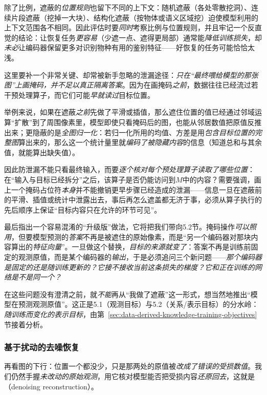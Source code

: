 除了比例，遮蔽的\emph{位置规则}也留下不同的上下文：随机遮蔽（各处零散挖洞）、连续片段遮蔽（挖掉一大块）、结构化遮蔽（按物体或语义区域挖）迫使模型利用的上下文范围各不相同。因此评估时要\emph{同时}考察比例与位置规则，并且牢记一个反直觉的结论：让恢复任务\emph{更容易}（少遮一点、遮得更局部）通常能\emph{降低训练损失}，却\emph{未必}让编码器保留更多对识别物种有用的鉴别特征——好恢复的任务可能恰恰太浅。

这里要补一个非常关键、却常被新手忽略的泄漏途径：\emph{只在“最终喂给模型的那张图”上画掩码，并不足以真正隔离答案}。因为在画掩码\emph{之前}，数据往往已经流过若干预处理算子，而它们可能\emph{早就读过}目标位置。

举例来说，如果在遮蔽\emph{之前}先做了平滑或插值，那么遮住位置的值已经通过邻域运算“扩散”到了周围像素里，模型即使只看掩码后的图，也能从邻居数值把原值反推出来；更隐蔽的是\emph{全图归一化}：若归一化所用的均值、方差是用\emph{包含目标位置的完整图}算出来的，那么这一个统计量里就\emph{编码了被隐藏内容}的信息（知道总和与其余值，就能算出缺失值）。

因此防泄漏不能只看最终输入，而要\emph{逐个核对每个预处理算子读取了哪些位置}：在“输入与目标已经拆分”之后，该算子是否仍能访问到$M$中的内容？需要强调，画上一个掩码占位符\emph{本身}并不能撤销更早步骤已经造成的泄漏——信息一旦在遮蔽前的平滑、插值或统计中泄露出去，事后再怎么遮盖都无济于事，必须从算子执行的先后顺序上保证“目标内容只在允许的环节可见”。

最后指出一个容易混淆的“升级版”做法，它将把我们带向5.2节。掩码操作\emph{可以照用}，但要模型预测的\emph{答案}不再是被遮住的原始像素，而是“另一个编码器对那块内容算出的\emph{特征向量}”。一旦做这个替换，\emph{目标的来源就变了}：答案不再是训练前固定的观测原值，而是某个编码器的\emph{输出}，于是必须追问三个新问题——\emph{那个编码器是固定的还是随训练更新的？它接不接收当前这条损失的梯度？它和正在训练的网络是不是同一个？}

在这些问题没有澄清之前，就\emph{不能}再从“我做了遮蔽”这一形式，想当然地推出“模型在预测观测原值”。这正是5.1（观测目标）与5.2（关系/表示目标）的分水岭：\emph{随训练而变化的表示目标}，由第~\ref{sec:data-derived-knowledge-training-objectives}节接着分析。

\subsubsection{基于扰动的去噪恢复}
\label{sec:data-derived-knowledge-denoising-recovery}

再看图的下行：位置一个都没少，只是那两处的原值被\emph{改成了错误的受损数值}。我们仍然手握\emph{未改动的原始观测}，用它核对模型能否把受损内容\emph{还原回去}，这就是（denoising reconstruction）。

